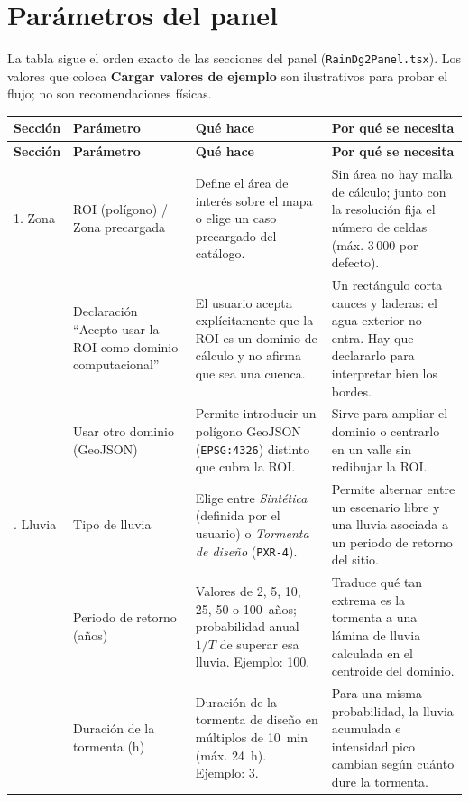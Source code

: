 \documentclass[11pt,letterpaper]{article}
\begin{document}
\section{Parámetros del panel}

La tabla sigue el orden exacto de las secciones del panel (\texttt{RainDg2Panel.tsx}). Los valores que coloca \textbf{Cargar valores de ejemplo} son ilustrativos para probar el flujo; no son recomendaciones físicas.

{\small
\renewcommand{\arraystretch}{1.24}
\begin{longtable}{@{}>{\raggedright\arraybackslash}p{2.2cm}>{\raggedright\arraybackslash}p{3.1cm}>{\raggedright\arraybackslash}p{5.4cm}>{\raggedright\arraybackslash}p{5.2cm}@{}}
\toprule
\textbf{Sección} & \textbf{Parámetro} & \textbf{Qué hace} & \textbf{Por qué se necesita}\\
\midrule
\endfirsthead
\toprule
\textbf{Sección} & \textbf{Parámetro} & \textbf{Qué hace} & \textbf{Por qué se necesita}\\
\midrule
\endhead
\bottomrule
\endfoot
1. Zona & ROI (polígono) / Zona precargada & Define el área de interés sobre el mapa o elige un caso precargado del catálogo. & Sin área no hay malla de cálculo; junto con la resolución fija el número de celdas (máx. 3\,000 por defecto).\\
 & Declaración ``Acepto usar la ROI como dominio computacional'' & El usuario acepta explícitamente que la ROI es un dominio de cálculo y no afirma que sea una cuenca. & Un rectángulo corta cauces y laderas: el agua exterior no entra. Hay que declararlo para interpretar bien los bordes.\\
 & Usar otro dominio (GeoJSON) & Permite introducir un polígono GeoJSON (\texttt{EPSG:4326}) distinto que cubra la ROI. & Sirve para ampliar el dominio o centrarlo en un valle sin redibujar la ROI.\\
2. Lluvia & Tipo de lluvia & Elige entre \emph{Sintética} (definida por el usuario) o \emph{Tormenta de diseño} (\texttt{PXR-4}). & Permite alternar entre un escenario libre y una lluvia asociada a un periodo de retorno del sitio.\\
 & Periodo de retorno (años) & Valores de 2, 5, 10, 25, 50 o 100~años; probabilidad anual $1/T$ de superar esa lluvia. Ejemplo: 100. & Traduce qué tan extrema es la tormenta a una lámina de lluvia calculada en el centroide del dominio.\\
 & Duración de la tormenta (h) & Duración de la tormenta de diseño en múltiplos de 10~min (máx. 24~h). Ejemplo: 3. & Para una misma probabilidad, la lluvia acumulada e intensidad pico cambian según cuánto dure la tormenta.\\

\end{longtable}}
\end{document}
